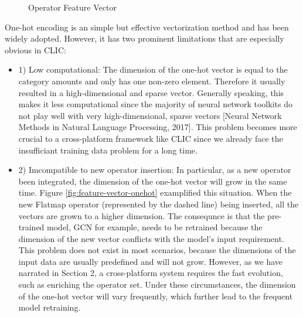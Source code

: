 \begin{figure}
  \caption{Operator Feature Vector}
  \label{fig:feature-vector}
\end{figure}

One-hot encoding is an simple but effective vectorization method and has been widely adopted. 
However, it has two prominent limitations that are especially obvious in CLIC:

\begin{itemize}
  \item 1) Low computational: 
  The dimension of the one-hot vector is equal to the category amounts and only has one non-zero element.
  Therefore it usually resulted in a high-dimensional and sparse vector. 
  Generally speaking, this makes it less computational since the majority of neural network toolkits do not play well with very high-dimensional, sparse vectors [Neural Network Methods in Natural Language Processing, 2017]. 
  This problem becomes more crucial to a cross-platform framework like CLIC since we already face the insufficiant training data problem for a long time.
  \item 2) Imcompatible to new operator insertion: 
  In particular, as a new operator been integrated, the dimension of the one-hot vector will grow in the same time. 
  Figure \ref{fig:feature-vector-onehot} examplified this situation. 
  When the new Flatmap operator (represented by the dashed line) being inserted, all the vectors are grown to a higher dimension.
  The consequnce is that the pre-trained model, GCN for example, needs to be retrained because the dimension of the new vector conflicts with the model's input requirement.
  This problem does not exist in most scenarios, because the dimensions of the input data are usually predefined and will not grow.
  However, as we have narrated in Section 2, a cross-platform system requires the fast evolution, such as enriching the operator set.
  Under these circumstances, the dimension of the one-hot vector will vary frequently, which further lead to the frequent model retraining.
\end{itemize}

